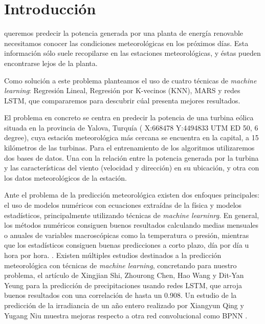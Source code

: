\documentclass[journal]{IEEEtran}
\begin{document}
\IEEEpeerreviewmaketitle



\section{Introducción}
 queremos predecir la potencia generada por una planta de energía renovable necesitamos conocer las condiciones meteorológicas en los próximos días. Esta información sólo suele recopilarse en las estaciones meteorológicas, y éstas pueden encontrarse lejos de la planta. 

Como solución a este problema planteamos el uso de cuatro técnicas de \emph{machine learning}: Regresión Lineal, Regresión por K-vecinos (KNN), MARS y redes LSTM, que compararemos para descubrir cúal presenta mejores resultados.

El problema en concreto se centra en  predecir la potencia de una turbina eólica situada en la provincia de Yalova, Turquía ( X:668478 Y:4494833 UTM ED 50, 6 degree), cuya estación meteorológica más cercana se encuentra en la capital, a 15 kilómetros de las turbinas.
Para el entrenamiento de los algoritmos utilizaremos dos bases de datos. Una con la relación entre la potencia generada por la turbina y las características del viento (velocidad y dirección) en su ubicación, y otra con los datos meteorológicos de la estación.


Ante el problema de la predicción meteorológica existen dos enfoques principales: el uso de modelos numéricos con ecuaciones extraídas de la física y modelos estadísticos, principalmente utilizando técnicas de \emph{machine learninrg}. \cite{FOLEY20121} En general, los métodos numéricos consiguen buenos resultados calculando medias mensuales o anuales de variables macroscópicas como la temperatura o presión, mientras que los estadísticos consiguen buenas predicciones a corto plazo, día por día u hora por hora. \cite{FOLEY20121} \cite{GIEBEL2003}.
Existen múltiples estudios destinados a la predicción meteorológica con técnicas de \emph{machine learning}, concretando para nuestro problema, el artículo de Xingjian Shi, Zhourong Chen, Hao Wang y Dit-Yan Yeung  para la predicción de precipitaciones usando redes LSTM\cite{NIPS2015_5955}, que arroja buenos resultados con una correlación de hasta un 0.908. Un estudio de la predicción de la irradiancia de un año entero realizado por Xiangyun Qing y Yugang Niu muestra mejoras respecto a otra red convolucional como BPNN \cite{QING2018461}.
\end{document}
